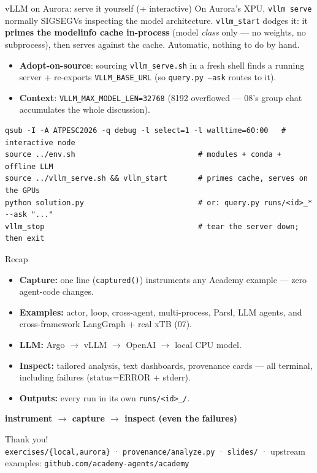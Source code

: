 \documentclass[aspectratio=169,11pt]{beamer}
\begin{document}
\begin{frame}[fragile]{vLLM on Aurora: serve it yourself (+ interactive)}
  \small On Aurora's XPU, \texttt{vllm serve} normally \alert{SIGSEGVs} inspecting the
  model architecture. \texttt{vllm\_start} dodges it: it \textbf{primes the modelinfo
  cache in-process} (model \emph{class} only --- no weights, no subprocess), then serves
  against the cache. \alert{Automatic}, nothing to do by hand.
  \begin{itemize}\footnotesize
    \item \textbf{Adopt-on-source}: sourcing \texttt{vllm\_serve.sh} in a fresh shell
      finds a running server + re-exports \texttt{VLLM\_BASE\_URL} (so \texttt{query.py
      --ask} routes to it).
    \item \textbf{Context}: \texttt{VLLM\_MAX\_MODEL\_LEN=32768} (8192 overflowed ---
      08's group chat accumulates the whole discussion).
  \end{itemize}
\begin{lstlisting}[style=sh]
qsub -I -A ATPESC2026 -q debug -l select=1 -l walltime=60:00   # interactive node
source ../env.sh                            # modules + conda + offline LLM
source ../vllm_serve.sh && vllm_start       # primes cache, serves on the GPUs
python solution.py                          # or: query.py runs/<id>_* --ask "..."
vllm_stop                                   # tear the server down; then exit
\end{lstlisting}
\end{frame}

\begin{frame}{Recap}
  \begin{itemize}
    \item \textbf{Capture:} one line (\texttt{captured()}) instruments any Academy
      example --- zero agent-code changes.
    \item \textbf{Examples:} actor, loop, cross-agent, multi-process, Parsl, LLM
      agents, and cross-framework LangGraph + real xTB (07).
    \item \textbf{LLM:} Argo $\to$ vLLM $\to$ OpenAI $\to$ local CPU model.
    \item \textbf{Inspect:} tailored analysis, text dashboards, provenance cards
      --- all terminal, including \alert{failures} (status=ERROR + stderr).
    \item \textbf{Outputs:} every run in its own \texttt{runs/<id>\_<date-time>/}.
  \end{itemize}
  \vspace{0.4em}
  \centering\Large\textbf{instrument $\to$ capture $\to$ inspect (even the failures)}
\end{frame}

\begin{frame}[standout]
  Thank you!\\[0.4em]
  \normalsize \texttt{exercises/\{local,aurora\}} · \texttt{provenance/analyze.py} ·
  \texttt{slides/} · upstream examples: \texttt{github.com/academy-agents/academy}
\end{frame}
\end{document}
